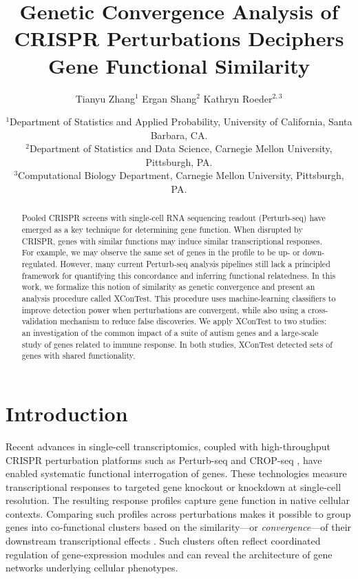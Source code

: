 \documentclass[11pt]{article}
\begin{document}
\title{
Genetic Convergence Analysis of CRISPR Perturbations Deciphers Gene Functional Similarity
}

\author{
  Tianyu Zhang$^{1}$ \quad
  Ergan Shang$^{2}$ \quad
  Kathryn Roeder$^{2,3}$
}

\date{
  {\small
  $^{1}$Department of Statistics and Applied Probability, University of California, Santa Barbara, CA.\\
  $^{2}$Department of Statistics and Data Science, Carnegie Mellon University, Pittsburgh, PA.\\
  $^{3}$Computational Biology Department, Carnegie Mellon University, Pittsburgh, PA.
  }
}

\maketitle

\begin{abstract}
Pooled CRISPR screens with single-cell RNA sequencing readout (Perturb-seq) have emerged as a key technique for determining gene function. When disrupted by CRISPR, genes with similar functions may induce similar transcriptional responses. For example, we may observe the same set of genes in the profile to be up- or down-regulated. However, many current Perturb-seq analysis pipelines still lack a principled framework for quantifying this concordance and inferring functional relatedness. In this work, we formalize this notion of similarity as genetic convergence and present an analysis procedure called XConTest. This procedure uses machine-learning classifiers to improve detection power when perturbations are convergent, while also using a cross-validation mechanism to reduce false discoveries. We apply XConTest to two studies: an investigation of the common impact of a suite of autism genes and a large-scale study of genes related to immune response. In both studies, XConTest detected sets of genes with shared functionality.
\end{abstract}

\newpage

\section*{Introduction}
Recent advances in single-cell transcriptomics, coupled with high-throughput CRISPR perturbation platforms such as Perturb-seq \citep{Adamson:2016,Dixit:2016} and CROP-seq \citep{Jaitin:2016,Datlinger:2017}, have enabled systematic functional interrogation of genes. These technologies measure transcriptional responses to targeted gene knockout or knockdown at single-cell resolution. The resulting response profiles capture gene function in native cellular contexts. Comparing such profiles across perturbations makes it possible to group genes into co-functional clusters based on the similarity---or \textit{convergence}---of their downstream transcriptional effects \citep{Dixit:2016,Frangieh:2021,duan2019model,peidli2024scperturb,Regev:2023,schnitzler2024convergence,yang2025perturbdb}. Such clusters often reflect coordinated regulation of gene-expression modules and can reveal the architecture of gene networks underlying cellular phenotypes.
\end{document}
